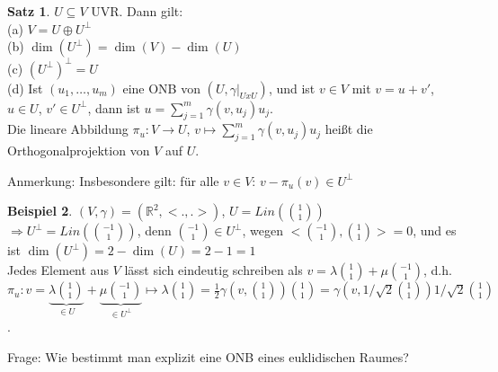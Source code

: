 \documentclass[10pt,a4paper,numbers=endperiod]{scrartcl}
\theoremstyle{definition}
\newtheorem{satz}{Satz}[section]
\newtheorem{bsp}[satz]{Beispiel}
\def\RR{{\mathbb R}}
\begin{document}
\begin{satz}
	$U \subseteq V$ UVR. Dann gilt:\\
	(a) $V = U \oplus U^\perp$\\
	(b) $\dim(U^\perp) = \dim(V) - \dim (U)$\\
	(c) $(U^\perp)^\perp = U$\\
	(d) Ist $(u_1, \ldots, u_m)$ eine ONB von $(U, \gamma|_{U x U})$, und ist $v \in V$ mit $v = u + v'$, $u \in U$, $v' \in U^\perp$, dann ist $u = \sum\limits_{j = 1}^{m} \gamma (v, u_j) u_j$.\\
	Die lineare Abbildung $\pi_u: V \rightarrow U$, $v \mapsto \sum\limits_{j = 1}^{m} \gamma (v, u_j) u_j$ heißt die Orthogonalprojektion von $V$ auf $U$.
\end{satz}


Anmerkung: Insbesondere gilt: für alle $v \in V$: $v - \pi_u (v) \in U^\perp$

\begin{bsp}
	$(V, \gamma) = (\RR^2, <.,.>)$, $U = Lin(\binom{1}{1})$\\
	$\Rightarrow U^\perp = Lin (\binom{-1}{1})$, denn $\binom{-1}{1} \in U^\perp$, wegen $< \binom{-1}{1}, \binom{1}{1}> = 0$, und es ist $\dim(U^\perp) = 2 - \dim(U) = 2-1 = 1$\\
	Jedes Element aus $V$ lässt sich eindeutig schreiben als $v = \lambda \binom{1}{1} + \mu \binom{-1}{1}$, d.h.\\
	$\pi_u: v = \underbrace{\lambda \binom{1}{1}}_{\in U} + \underbrace{\mu \binom{-1}{1}}_{\in U^\perp} \mapsto \lambda \binom{1}{1} = \frac{1}{2} \gamma (v, \binom{1}{1}) \binom{1}{1} = \gamma (v, 1/\sqrt{2} \binom{1}{1}) 1/\sqrt{2} \binom{1}{1}$.
\end{bsp}

Frage: Wie bestimmt man explizit eine ONB eines euklidischen Raumes? 
\end{document}
